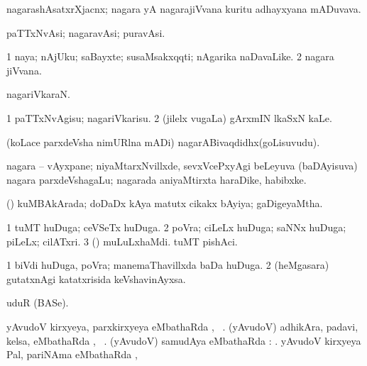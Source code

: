 {{\bentry
{} 
\gl{\nA}
\expl{}
\bmng
nagarashAsatxrXjacnx; nagara yA nagarajiVvana kuritu adhayxyana mADuvava. 
\emng
\eentry

\bentry
{} 
\gl{\nA}
\expl{}
\bmng
paTTxNvAsi; nagaravAsi; puravAsi. 
\emng
\eentry

\bentry
{} 
\gl{\nA}
\bmng
\bnum
\num{1} naya; nAjUku; saBayxte; susaMsakxqqti; nAgarika naDavaLike. 
\num{2} nagara jiVvana. 
\enum
\emng
\eentry

\bentry
{} 
\gl{\nA}
\expl{}
\bmng
nagariVkaraN. 
\emng
\eentry

\bentry
{} 
\gl{\sakirx}
\expl{}
\bmng
\bnum
\num{1} paTTxNvAgisu; nagariVkarisu. 
\num{2} (jilelx \mo vugaLa) gArxmIN lkaSxN kaLe. 
\enum
\emng
\eentry

\bentry
{}
\gl{\nA}
\expl{}
\bmng
(koLace parxdeVsha nimURlna mADi) nagarABivaqdidhx(goLisuvudu). 
\emng
\eentry

\bentry
{}
\gl{\nA}
\expl{}
\bmng
nagara -- vAyxpane; niyaMtarxNvillxde, sevxVcePxyAgi beLeyuva (baDAyisuva) nagara parxdeVshagaLu; nagarada aniyaMtirxta haraDike, habibxke. 
\emng
\eentry

\bentry
{} 
\gl{\gu}
\bmng
(\savi) kuMBAkArada; doDaDx kAya matutx cikakx bAyiya; gaDigeyaMtha. 
\emng
\eentry

\bentry
{} 
\gl{\nA}
\bmng
\bnum
\num{1} tuMT huDuga; ceVSeTx huDuga. 
\num{2} poVra; ciLeLx huDuga; saNNx huDuga; piLeLx; cilATxri. 
\num{3}  
 (\pArxparx) 
\banum
{} muLuLxhaMdi. 
 tuMT pishAci. 
\eanum
\numie
\enum
\emng

\noindent 
\gl{\pagu}
\expl{}
\bmng
\bnum
\num{1}  biVdi huDuga, poVra; manemaThavillxda baDa huDuga. 
\num{2} (heMgasara) gutatxnAgi katatxrisida keVshavinAyxsa. 
\enum
\emng
\eentry

\bentry
{} 
\gl{\nA}
\expl{}
\bmng
uduR (BASe). 
\emng
\eentry

\bentry
{}
\gl{\uparx}
\expl{}
\bmng
\banum
{} yAvudoV kirxyeya, parxkirxyeya eMbathaRda \uparx, \udA\ . 
 (yAvudoV) adhikAra, padavi, kelsa, eMbathaRda \uparx, \udA\ . 
 (yAvudoV) samudAya eMbathaRda \uparx: . 
 yAvudoV kirxyeya Pal, pariNAma eMbathaRda \uparx, \udA\  
\eanum
\emng
\eentry

}}
